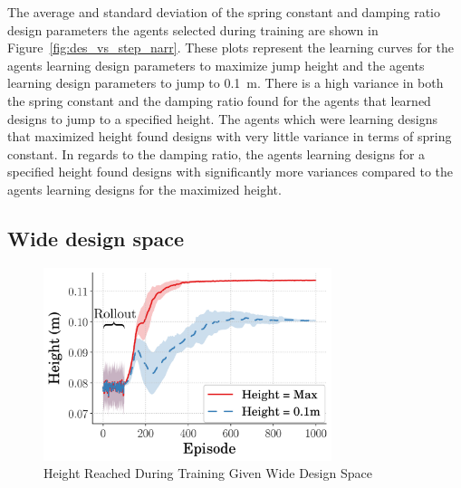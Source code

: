 The average and standard deviation of the spring constant and damping ratio design parameters the agents selected during training are shown in Figure~\ref{fig:des_vs_step_narr}. These plots represent the learning curves for the agents learning design parameters to maximize jump height and the agents learning design parameters to jump to 0.1~m. There is a high variance in both the spring constant and the damping ratio found for the agents that learned designs to jump to a specified height. The agents which were learning designs that maximized height found designs with very little variance in terms of spring constant. In regards to the damping ratio, the agents learning designs for a specified height found designs with significantly more variances compared to the agents learning designs for the maximized height.

\subsection{Wide design space}
%
\begin{figure}[tb!]
        \centering
        \includegraphics[width=0.75\textwidth]{figures//Ch4/design_space_wide/HeightVsTime.png}  
        \caption{Height Reached During Training Given Wide Design Space}
        \label{fig:height_v_step_wide}
\end{figure}
%

